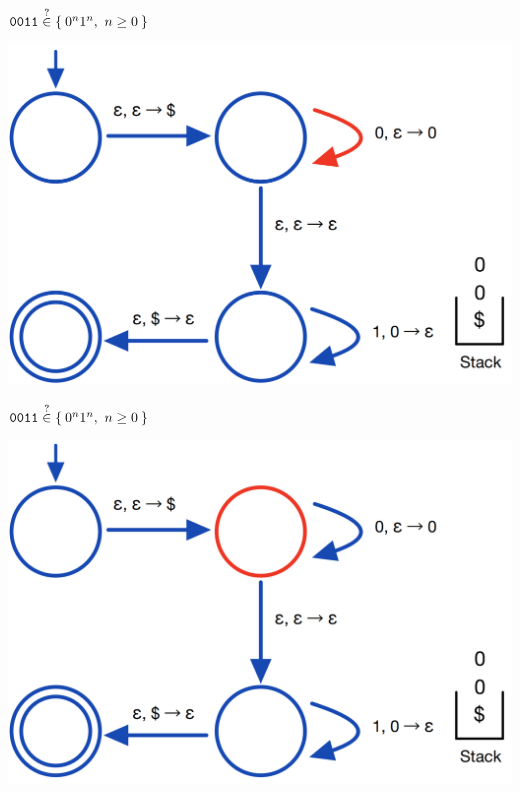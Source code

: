 \documentclass[aspectratio=169]{beamer}
\begin{document}
\begin{frame}{$\texttt{0011} \stackrel{?}{\in} \Set{0^n 1^n,\ n \geq 0}$}
    \begin{center}
        \includegraphics[scale=0.30]{images/pda_comp/PDA_Comp_6.png}
    \end{center}
\end{frame}

\begin{frame}{$\texttt{0011} \stackrel{?}{\in} \Set{0^n 1^n,\ n \geq 0}$}
    \begin{center}
        \includegraphics[scale=0.30]{images/pda_comp/PDA_Comp_7.png}
    \end{center}
\end{frame}
\end{document}
